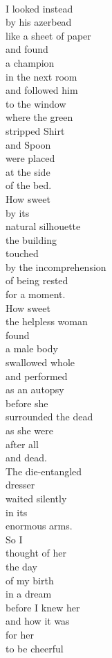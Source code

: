 \documentclass[smalldemyvopaper,11pt,twoside,onecolumn,openright,extrafontsizes]{memoir}
\begin{document}
\\I looked instead
\\by his azerbead
\\like a sheet of paper
\\and found
\\a champion
\\in the next room
\\and followed him
\\to the window
\\where the green
\\stripped Shirt
\\and Spoon
\\were placed
\\at the side
\\of the bed.
\\How sweet
\\by its
\\natural silhouette
\\the building
\\touched
\\by the incomprehension
\\of being rested
\\for a moment.
\\How sweet
\\the helpless woman
\\found
\\a male body
\\swallowed whole
\\and performed
\\as an autopsy
\\before she
\\surrounded the dead
\\as she were
\\after all
\\and dead.
\\The die-entangled
\\dresser
\\waited silently
\\in its
\\enormous arms.
\\So I
\\thought of her
\\the day
\\of my birth
\\in a dream
\\before I knew her
\\and how it was
\\for her
\\to be cheerful
\end{document}
